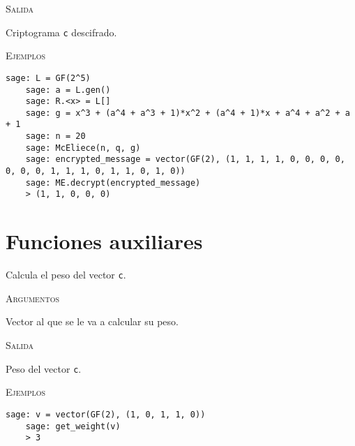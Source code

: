 \begin{description}[leftmargin=1em, font=\normalfont\ttfamily, style=nextline]
\begin{description}[font=\ttfamily, style=nextline]
  \textsc{Salida}
  \begin{description}[font=\normalfont\ttfamily]
    \item[] Criptograma \texttt{c} descifrado.
  \end{description}

  \textsc{Ejemplos}
  \begin{lstlisting}[gobble=4]
    sage: L = GF(2^5)
    sage: a = L.gen()
    sage: R.<x> = L[]
    sage: g = x^3 + (a^4 + a^3 + 1)*x^2 + (a^4 + 1)*x + a^4 + a^2 + a + 1
    sage: n = 20
    sage: McEliece(n, q, g)
    sage: encrypted_message = vector(GF(2), (1, 1, 1, 1, 0, 0, 0, 0, 0, 0, 0, 1, 1, 1, 0, 1, 1, 0, 1, 0))
    sage: ME.decrypt(encrypted_message)
    > (1, 1, 0, 0, 0)
  \end{lstlisting}
  \end{description}
\end{description}

\section{Funciones auxiliares}

\begin{description}[leftmargin=1em, font=\normalfont\ttfamily, style=nextline]
  \item[get\_weight(c)] Calcula el peso del vector \texttt{c}.

  \textsc{Argumentos}
  \begin{description}[font=\normalfont\ttfamily]
    \item[c] Vector al que se le va a calcular su peso.
  \end{description}

  \textsc{Salida}
  \begin{description}[font=\normalfont\ttfamily]
    \item[] Peso del vector \texttt{c}.
  \end{description}

  \textsc{Ejemplos}
  \begin{lstlisting}[gobble=4]
    sage: v = vector(GF(2), (1, 0, 1, 1, 0))
    sage: get_weight(v)
    > 3
  \end{lstlisting}
\end{description}